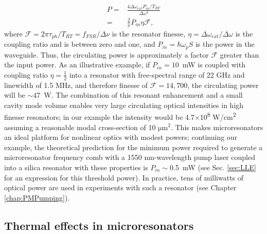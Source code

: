    \begin{align}
   P=&\frac{4\Delta\omega_{ext}P_{in}/T_{RT}}{\Delta\omega^2}\\
   =&\frac{2 }{\pi}P_{in}\eta\mathcal{F},
   \end{align}
   where $\mathcal{F}=2\pi\tau_{ph}/T_{RT}=f_{FSR}/\Delta\nu$ is the resonator finesse, $\eta=\Delta\omega_{ext}/\Delta\omega$ is the coupling ratio and is between zero and one, and $P_{in}=\hbar\omega_p S$ is the power in the waveguide. Thus, the circulating power is approximately a factor $\mathcal{F}$ greater than the input power. As an illustrative example, if $P_{in}=10$~mW is coupled with coupling ratio $\eta=\frac{1}{2}$ into a resonator with free-spectral range of 22 GHz and linewidth of 1.5 MHz, and therefore finesse of $\mathcal{F}=14,700$, the circulating power will be $\sim$47~W. The combination of this resonant enhancement and a small cavity mode volume enables very large circulating optical intensities in high finesse resonators; in our example the intensity would be 4.7$\times$10\textsuperscript{8} W/cm\textsuperscript{2} assuming a reasonable modal cross-section of 10 $\mathrm{\mu m^2}$. This makes microresonators an ideal platform for nonlinear optics with modest powers; continuing our example, the theoretical prediction for the minimum power required to generate a microresonator frequency comb with a 1550 nm-wavelength pump laser coupled into a silica resonator with these properties is $P_{in}\sim$0.5~mW (see Sec. \ref{sec:LLE} for an expression for this threshold power). In practice, tens of milliwatts of optical power are used in experiments with such a resonator (see Chapter \ref{chap:PMPumping}).


\subsection{Thermal effects in microresonators} \label{sec:thermaleffects}


